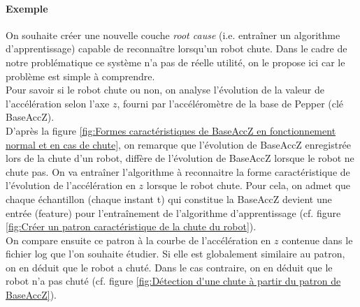 \paragraph{Exemple} On souhaite créer une nouvelle couche \emph{root cause} (i.e. entraîner un algorithme d'apprentissage) capable de reconnaître lorsqu'un robot chute. Dans le cadre de notre problématique ce système n'a pas de réelle utilité, on le propose ici car le problème est simple à comprendre. \\
Pour savoir si le robot chute ou non, on analyse l'évolution de la valeur de l'accélération selon l'axe $z$, fourni par l'accéléromètre de la base de Pepper (clé BaseAccZ). \\
D'après la figure \ref{fig:Formes caractéristiques de BaseAccZ en fonctionnement normal et en cas de chute}, on remarque que l'évolution de BaseAccZ enregistrée lors de la chute d'un robot, diffère de l'évolution de BaseAccZ lorsque le robot ne chute pas. On va entraîner l'algorithme à reconnaitre la forme caractéristique de l'évolution de l'accélération en $z$ lorsque le robot chute. Pour cela, on admet que chaque échantillon (chaque instant t) qui constitue la BaseAccZ devient une entrée (feature) pour l'entraînement de l'algorithme d'apprentissage (cf. figure \ref{fig:Créer un patron caractéristique de la chute du robot}). \\
On compare ensuite ce patron à la courbe de l'accélération en $z$ contenue dans le fichier log que l'on souhaite étudier. Si elle est globalement similaire au patron, on en déduit que le robot a chuté. Dans le cas contraire, on en déduit que le robot n'a pas chuté (cf. figure \ref{fig:Détection d'une chute à partir du patron de BaseAccZ}).

